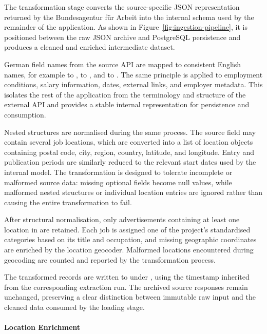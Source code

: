 \documentclass[11pt,a4paper]{article}
\begin{document}
The transformation stage converts the source-specific JSON representation returned by the Bundesagentur für Arbeit into the internal schema used by the remainder of the application. As shown in Figure~\ref{fig:ingestion-pipeline}, it is positioned between the raw JSON archive and PostgreSQL persistence and produces a cleaned and enriched intermediate dataset.

German field names from the source API are mapped to consistent English names, for example  to ,  to , and  to . The same principle is applied to employment conditions, salary information, dates, external links, and employer metadata. This isolates the rest of the application from the terminology and structure of the external API and provides a stable internal representation for persistence and consumption.

Nested structures are normalised during the same process. The source field  may contain several job locations, which are converted into a list of location objects containing postal code, city, region, country, latitude, and longitude. Entry and publication periods are similarly reduced to the relevant start dates used by the internal model. The transformation is designed to tolerate incomplete or malformed source data: missing optional fields become null values, while malformed nested structures or individual location entries are ignored rather than causing the entire transformation to fail.

After structural normalisation, only advertisements containing at least one location in  are retained. Each job is assigned one of the project's standardised categories based on its title and occupation, and missing geographic coordinates are enriched by the location geocoder. Malformed locations encountered during geocoding are counted and reported by the transformation process.

The transformed records are written to  under , using the timestamp inherited from the corresponding extraction run. The archived source responses remain unchanged, preserving a clear distinction between immutable raw input and the cleaned data consumed by the loading stage.

\paragraph{Location Enrichment}
\end{document}

